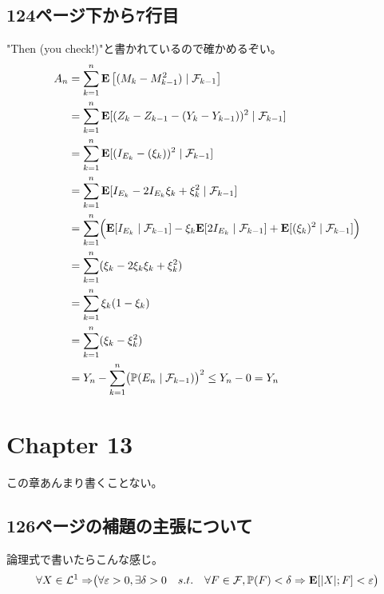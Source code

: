  \subsection{124ページ下から7行目}
    "Then (you check!)"と書かれているので確かめるぞい。
    \begin{align*}
      A_n &= \sum_{k=1}^n {\mathbf{E}}\left[(M_k - M_{k-1}^2) \mid \mathcal{F}_{k-1}\right] \\
      &= \sum_{k=1}^n {\mathbf{E}}[(Z_k - Z_{k-1} - (Y_k - Y_{k-1}))^2 \mid \mathcal{F}_{k-1}]\\
      &= \sum_{k=1}^n {\mathbf{E}}[(I_{E_k} - (\xi_k))^2 \mid \mathcal{F}_{k-1}]\\
      &= \sum_{k=1}^n {\mathbf{E}}[I_{E_k} - 2I_{E_k}\xi_k  + \xi_k^2 \mid \mathcal{F}_{k-1}]\\
      &= \sum_{k=1}^n \Bigl({\mathbf{E}}[I_{E_k} \mid \mathcal{F}_{k-1}] - \xi_k{\mathbf{E}}[2I_{E_k} \mid \mathcal{F}_{k-1}]  + {\mathbf{E}}[(\xi_k)^2 \mid \mathcal{F}_{k-1}] \Bigr)\\
      &= \sum_{k=1}^n (\xi_k -2\xi_k\xi_k + \xi_k^2) \\
      &= \sum_{k=1}^n \xi_k(1 - \xi_k) \\
      &= \sum_{k=1}^n (\xi_k - \xi_k^2) \\
      &= Y_n - \sum_{k=1}^n \bigl( {\mathbb{P}}(E_n \mid \mathcal{F}_{k-1}) \bigr)^2 \leq Y_n - 0 = Y_n
    \end{align*}

\section{Chapter 13}
  この章あんまり書くことない。
  \subsection{126ページの補題の主張について}
    論理式で書いたらこんな感じ。
    \[\forall X \in \mathcal{L}^1 \Rightarrow \bigr(\forall \varepsilon > 0, \exists \delta > 0 \quad s.t.\quad \forall F \in \mathcal{F} , {\mathbb{P}}(F) < \delta \Rightarrow {\mathbf{E}}[|X| ; F] < \varepsilon \bigl)\]

